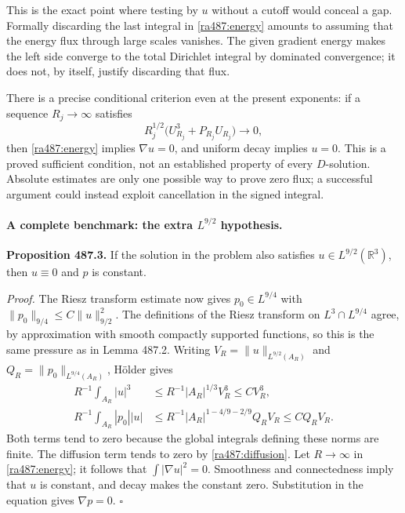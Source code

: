 \documentclass[11pt]{article}
\begin{document}
This is the exact point where testing by $u$ without a cutoff would
conceal a gap. Formally discarding the last integral in
\eqref{ra487:energy} amounts to assuming that the energy flux through
large scales vanishes. The given gradient energy makes the left side
converge to the total Dirichlet integral by dominated convergence; it
does not, by itself, justify discarding that flux.

There is a precise conditional criterion even at the present exponents:
if a sequence $R_j\to\infty$ satisfies
\begin{equation}\label{ra487:tailcriterion}
 R_j^{1/2}\bigl(U_{R_j}^3+P_{R_j}U_{R_j}\bigr)\longrightarrow0,
\end{equation}
then \eqref{ra487:energy} implies $\nabla u=0$, and uniform decay
implies $u=0$. This is a proved sufficient condition, not an established
property of every $D$-solution. Absolute estimates are only one possible
way to prove zero flux; a successful argument could instead exploit
cancellation in the signed integral.

\paragraph{A complete benchmark: the extra $L^{9/2}$ hypothesis.}
\textbf{Proposition 487.3.} If the solution in the problem also satisfies
$u\in L^{9/2}(\mathbb R^3)$, then $u\equiv0$ and $p$ is constant.

\emph{Proof.}
The Riesz transform estimate now gives
$p_0\in L^{9/4}$ with
$\|p_0\|_{9/4}\leq C\|u\|_{9/2}^2$.
The definitions of the Riesz transform on $L^3\cap L^{9/4}$ agree,
by approximation with smooth compactly supported functions, so this is
the same pressure as in Lemma 487.2.
Writing $V_R=\|u\|_{L^{9/2}(A_R)}$ and
$Q_R=\|p_0\|_{L^{9/4}(A_R)}$, H\"older gives
\begin{align*}
 R^{-1}\int_{A_R}|u|^3
  &\leq R^{-1}|A_R|^{1/3}V_R^3\leq C V_R^3,\\
 R^{-1}\int_{A_R}|p_0||u|
  &\leq R^{-1}|A_R|^{1-4/9-2/9}Q_R V_R
       \leq C Q_R V_R.
\end{align*}
Both terms tend to zero because the global integrals defining these
norms are finite. The diffusion term tends to zero by
\eqref{ra487:diffusion}. Let $R\to\infty$ in
\eqref{ra487:energy}; it follows that $\int|\nabla u|^2=0$.
Smoothness and connectedness imply that $u$ is constant, and decay makes
the constant zero. Substitution in the equation gives $\nabla p=0$.
\hfill$\square$
\end{document}
